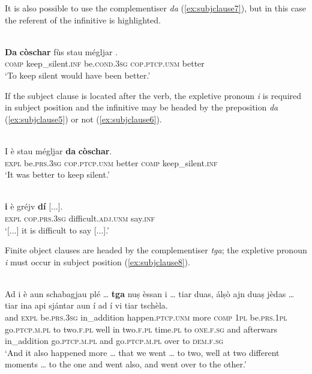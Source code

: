 It is also possible to use the complementiser \textit{da} (\ref{ex:subjclause7}), but in this case the referent of the infinitive is highlighted.

\ea
\label{ex:subjclause7}
\\
\gll \textbf{Da} \textbf{còschar} fùs stau mégljar .\\
\textsc{comp} keep\_silent.\textsc{inf} be.\textsc{cond.3sg} \textsc{cop.ptcp.unm} better \\
\glt `To keep silent would have been better.'
\z

If the subject clause is located after the verb, the expletive pronoun \textit{i} is required in subject position and the infinitive may be headed by the preposition \textit{da} (\ref{ex:subjclause5}) or not (\ref{ex:subjclause6}).

\ea
\label{ex:subjclause5}
\\
\gll I è stau mégljar \textbf{da} \textbf{còschar}.\\
\textsc{expl} be.\textsc{prs.3sg} \textsc{cop.ptcp.unm} better \textsc{comp} keep\_silent.\textsc{inf}\\
\glt `It was better to keep silent.'
\z

\ea
\label{ex:subjclause6}
\\
	\gll [...] \textbf{i} è gréjv \textbf{dí} [...].\\
 {} \textsc{expl} \textsc{cop.prs.3sg} difficult.\textsc{adj.unm} say.\textsc{inf}\\
\glt `[...] it is difficult to say [...].'
\z

Finite object clauses are headed by the complementiser \textit{tga}; the expletive pronoun \textit{i} must occur in subject position (\ref{ex:subjclause8}).

\ea
\label{ex:subjclause8}
\\
\gll    Ad i è aun schabagjau plé … \textbf{tga} nuṣ èssan i … tiar duas, álṣò ajn duaṣ jèdas … tiar ina api sjántar aun í ad í vi tiar tschèla.\\
and \textsc{expl} be.\textsc{prs.3sg} in\_addition happen.\textsc{ptcp.unm} more {} \textsc{comp}  \textsc{1pl} be.\textsc{prs.1pl} go.\textsc{ptcp.m.pl} {} to two.\textsc{f.pl} well in two.\textsc{f.pl} time.\textsc{pl} {} to \textsc{one.f.sg} and afterwars in\_addition go.\textsc{ptcp.m.pl} and  go.\textsc{ptcp.m.pl} over to \textsc{dem.f.sg}\\
\glt `And it also happened more … that we went … to two, well at two different moments … to the one and went also, and went over to the other.'
\z


